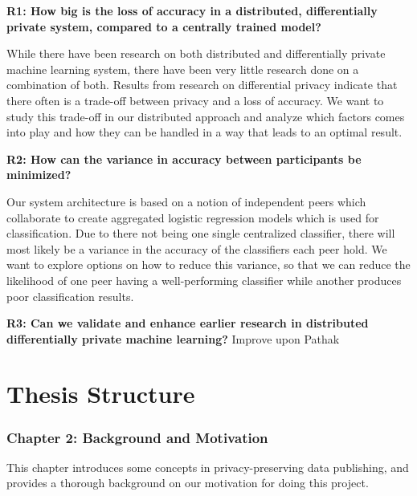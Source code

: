 \vspace{3mm}
\noindent\textbf{R1: How big is the loss of accuracy in a distributed, differentially private system, compared to a centrally trained model?}

\noindent While there have been research on both distributed and differentially private machine learning system, there have been very little research done on a combination of both. Results from research on differential privacy indicate that there often is a trade-off between privacy and a loss of accuracy. We want to study this trade-off in our distributed approach and analyze which factors comes into play and how they can be handled in a way that leads to an optimal result. 

\vspace{3mm}
\noindent
\textbf{R2: How can the variance in accuracy between participants be minimized?}

\noindent Our system architecture is based on a notion of independent peers which collaborate to create aggregated logistic regression models which is used for classification. Due to there not being one single centralized classifier, there will most likely be a variance in the accuracy of the classifiers each peer hold. We want to explore options on how to reduce this variance, so that we can reduce the likelihood of one peer having a well-performing classifier while another produces poor classification results. 

\vspace{3mm}
\noindent
\textbf{R3: Can we validate and enhance earlier research in distributed differentially private machine learning?}
Improve upon Pathak



\section{Thesis Structure}
\subsubsection{Chapter 2: Background and Motivation}
This chapter introduces some concepts in privacy-preserving data publishing, and provides a thorough background on our motivation for doing this project.

